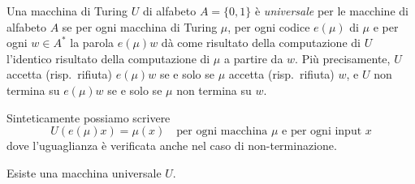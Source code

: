 \begin{defi}
Una macchina di Turing $U$ di alfabeto $A=\{0,1\}$ è \emph{universale} per le macchine di alfabeto $A$ se per ogni macchina di Turing $\mu$, per ogni codice $e(\mu)$ di $\mu$ e per ogni $w\in A^*$ la parola $e(\mu)w$ dà come risultato della computazione di $U$ l'identico risultato della computazione di $\mu$ a partire da $w$. Più precisamente, $U$ accetta (risp.\ rifiuta) $e(\mu)w$ se e solo se $\mu$ accetta (risp.\ rifiuta) $w$, e $U$ non termina su $e(\mu)w$ se e solo se $\mu$ non termina su $w$.
\end{defi}

Sinteticamente possiamo scrivere
\[
\boxed{U(e(\mu)x)=\mu(x)\quad\text{per ogni macchina }\mu\text{ e per ogni input }x}
\]
dove l'uguaglianza è verificata anche nel caso di non-terminazione.

\begin{prop}
Esiste una macchina universale $U$.
\end{prop}

